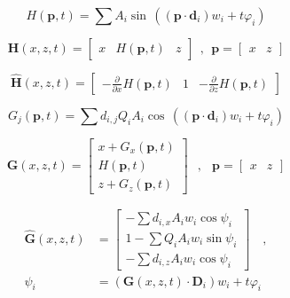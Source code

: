\begin{equation} \label{eq:sum_of_sine_waves}
    H(\mathbf{p},t) = \sum{
        A_i \sin \, (
            (\mathbf{p} \cdot \mathbf{d}_i) w_i
            + t \varphi_i
        )
    }
\end{equation}

\begin{equation} \label{eq:sum_of_sine_waves_position}
    \mathbf{H}(x,z,t) = \begin{bmatrix}
        x&
        H(\mathbf{p},t)&
        z
    \end{bmatrix}\;\,,\;\,
    \mathbf{p} = \begin{bmatrix}
        x&z
    \end{bmatrix}
\end{equation}

\begin{equation} \label{eq:sum_of_sine_waves_normal}
    \mathbf{\hat{H}}(x,z,t) = \begin{bmatrix}
        -\frac{\partial}{\partial x} H(\mathbf{p},t)&
        1&
        -\frac{\partial}{\partial z} H(\mathbf{p},t)
    \end{bmatrix}
\end{equation}

\begin{equation} \label{eq:gerstner_wave}
    G_j(\mathbf{p},t) = \sum{
        d_{i,j} Q_iA_i \cos \, (
            (\mathbf{p} \cdot \mathbf{d}_i) w_i
            + t \varphi_i
        )
    }
\end{equation}

\begin{equation} \label{eq:gerstner_wave_position}
    \mathbf{G}(x,z,t) = \begin{bmatrix}
        x + G_x(\mathbf{p},t)\\
        H(\mathbf{p},t)\\
        z + G_z(\mathbf{p},t)
    \end{bmatrix}\;\;\,,\;\;\,
    \mathbf{p} = \begin{bmatrix}
        x&z
    \end{bmatrix}
\end{equation}

\begin{equation} \label{eq:gerstner_wave_normal}
    \begin{split}
    \mathbf{\hat{G}}(x,z,t) &= \begin{bmatrix}
        -\sum{d_{i,x} A_iw_i \cos \psi_i}\\
        1 - \sum{Q_iA_iw_i \sin \psi_i}\\
        -\sum{d_{i,z} A_iw_i \cos \psi_i}
    \end{bmatrix}\;\;\;\,,\\
        \psi_i &= (\mathbf{G}(x,z,t) \cdot \mathbf{D}_i)w_i + t \varphi_i
    \end{split}
\end{equation}
